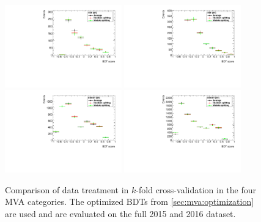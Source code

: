 \begin{figure}[htb]
    \centering
    \includegraphics[width=0.45\textwidth]{./plots/mva/data_treatment/VBF_SF_average_vs_split.pdf}
    \includegraphics[width=0.45\textwidth]{./plots/mva/data_treatment/VBF_DF_average_vs_split.pdf} \\
    \includegraphics[width=0.45\textwidth]{./plots/mva/data_treatment/BOOST_SF_average_vs_split.pdf}
    \includegraphics[width=0.45\textwidth]{./plots/mva/data_treatment/BOOST_DF_average_vs_split.pdf}
    \caption{Comparison of data treatment in $k$-fold cross-validation in the four MVA categories.
             The optimized BDTs from \cref{sec:mva:optimization} are used and are evaluated on the full
             2015 and 2016 dataset.}\label{fig:mva:data_treatment}
\end{figure}


